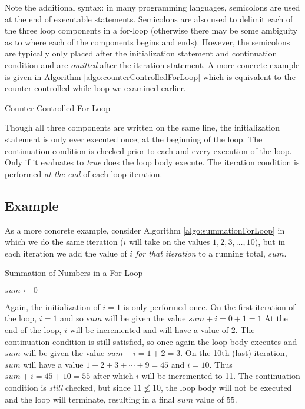 Note the additional syntax: in many programming languages, semicolons are used
at the end of executable statements.  Semicolons are also used to delimit each of
the three loop components in a for-loop (otherwise there may be some ambiguity as
to where each of the components begins and ends).  However, the semicolons are
typically only placed after the initialization statement and continuation condition and 
are \emph{omitted} after the iteration statement.  A more concrete example is given in 
Algorithm \ref{algo:counterControlledForLoop} which is equivalent
to the counter-controlled while loop we examined earlier.

\begin{algorithm}[h]
\caption{Counter-Controlled For Loop}
\label{algo:counterControlledForLoop}
\end{algorithm}

Though all three components are written on the same line, the initialization statement
is only ever executed once; at the beginning of the loop.  The continuation condition is
checked prior to each and every execution of the loop.  Only if it evaluates to \emph{true}
does the loop body execute.  The iteration condition is performed \emph{at the end} of
each loop iteration.  

\subsection{Example}
\label{subsection:summationExample}

As a more concrete example, consider Algorithm \ref{algo:summationForLoop} in which 
we do the same iteration ($i$ will take on the values $1, 2, 3, \ldots, 10$), but in each 
iteration we add the value of $i$ \emph{for that iteration} to a running total, $sum$.

\begin{algorithm}[h]
\caption{Summation of Numbers in a For Loop}
\label{algo:summationForLoop}
$sum \leftarrow 0$ \;
\end{algorithm}

Again, the initialization of $i = 1$ is only performed once.  On the first iteration of the loop, 
$i = 1$ and so $sum$ will be given the value $sum + i = 0 + 1 = 1$  At the end of the loop, 
$i$ will be incremented and will have a value of $2$.  The continuation condition is still satisfied, 
so once again the loop body executes and $sum$ will be given the value $sum + i = 1 + 2 = 3$.
On the 10th (last) iteration, $sum$ will have a value $1 + 2 + 3 + \cdots + 9 = 45$ and $i = 10$.
Thus $sum + i = 45 + 10 = 55$ after which $i$ will be incremented to 11.  The continuation condition
is \emph{still} checked, but since $11 \not\leq 10$, the loop body will not be executed and
the loop will terminate, resulting in a final $sum$ value of $55$.

